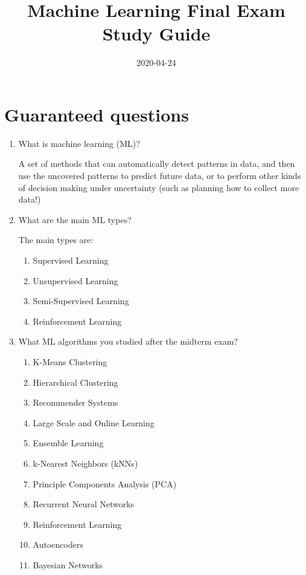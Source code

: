 \documentclass[12pt]{article}
\title{Machine Learning Final Exam Study Guide}
\date{2020-04-24}
\newenvironment{QandA}{\begin{enumerate}[label=\bfseries\arabic*.]\bfseries}
{\end{enumerate}}
\newenvironment{answered}{\par\normalfont\color{Sepia}}{}
\begin{document}
\noindent%
  
\section*{Guaranteed questions}
\begin{QandA}

\item What is machine learning (ML)? 
\begin{answered} 
    A set of methods that can automatically detect patterns in
    data, and then use the uncovered patterns to predict future
    data, or to perform other kinds of decision making under
    uncertainty (such as planning how to collect more data!)
\end{answered}

\item What are the main ML types? 
\begin{answered} 
    The main types are:
    \begin{enumerate}
        \item Supervised Learning 
        \item Unsupervised Learning
        \item Semi-Supervised Learning
        \item Reinforcement Learning 
    \end{enumerate}
\end{answered}

\item What ML algorithms you studied after the midterm exam?
\begin{answered} 
    \begin{enumerate}
    \item K-Means Clustering
    \item Hierarchical Clustering
    \item Recommender Systems
    \item Large Scale and Online Learning
    \item Ensemble Learning
    \item k-Nearest Neighbors (kNNs)
    \item Principle Components Analysis (PCA)
    \item Recurrent Neural Networks
    \item Reinforcement Learning
    \item Autoencoders
    \item Bayesian Networks
    \end{enumerate}
\end{answered}


\end{QandA}
\end{document}
